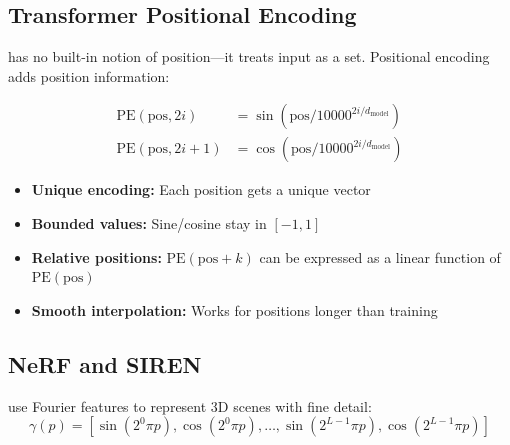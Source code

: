 \subsection{Transformer Positional Encoding}

 has no built-in notion of position---it treats input as a set. Positional encoding adds position information:

\begin{align}
    \text{PE}(\text{pos}, 2i) &= \sin\left(\text{pos} / 10000^{2i/d_{\text{model}}}\right) \\
    \text{PE}(\text{pos}, 2i+1) &= \cos\left(\text{pos} / 10000^{2i/d_{\text{model}}}\right)
\end{align}

\begin{itemize}
    \item \textbf{Unique encoding:} Each position gets a unique vector
    \item \textbf{Bounded values:} Sine/cosine stay in $[-1, 1]$
    \item \textbf{Relative positions:} $\text{PE}(\text{pos} + k)$ can be expressed as a linear function of $\text{PE}(\text{pos})$
    \item \textbf{Smooth interpolation:} Works for positions longer than training
\end{itemize}



\subsection{NeRF and SIREN}

 use Fourier features to represent 3D scenes with fine detail:
\begin{equation}
    \gamma(p) = [\sin(2^0 \pi p), \cos(2^0 \pi p), \ldots, \sin(2^{L-1} \pi p), \cos(2^{L-1} \pi p)]
\end{equation}

